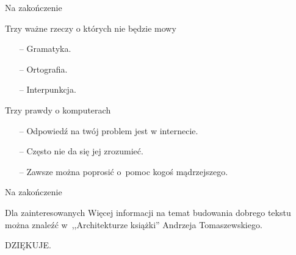 \documentclass{beamer}  %
\begin{document}
\begin{frame}{Na zakończenie}

  \begin{block}{Trzy ważne rzeczy o których nie będzie mowy}
    \begin{itemize}
    \item[--] Gramatyka.
    \item[--] Ortografia.
    \item[--] Interpunkcja.
    \end{itemize}
  \end{block}

  \begin{block}{Trzy prawdy o komputerach}
    \begin{itemize}
    \item[--] Odpowiedź na twój problem jest w internecie.
    \item[--] Często nie da się jej zrozumieć.
    \item[--] Zawsze można poprosić o~pomoc kogoś mądrzejszego.
    \end{itemize}
  \end{block}

\end{frame}



\begin{frame}{Na zakończenie}

  \begin{block}{Dla zainteresowanych}
    Więcej informacji na temat budowania dobrego tekstu można znaleźć
    w~,,Architekturze książki'' Andrzeja Tomaszewskiego.
  \end{block}
  \pause

  \begin{center}
    \begin{LARGE}
      DZIĘKUJE.
    \end{LARGE}
  \end{center}

\end{frame}





 {}



\end{document}
